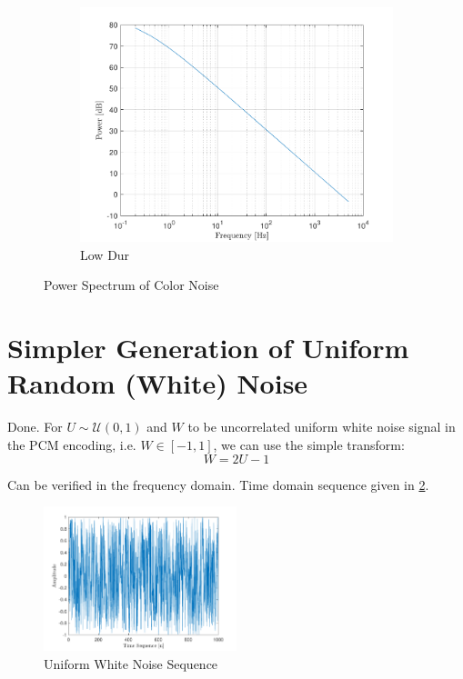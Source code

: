 \documentclass[10pt]{article}
\begin{document}
\begin{figure}[ht]
\begin{subfigure}[b]{0.31\textwidth}
        \includegraphics[width=\textwidth]{problem11_brown_noise_power_spectrum_db.pdf}
        \caption{Low Dur}
    \end{subfigure}
    \caption{Power Spectrum of Color Noise\vspace{-0.5cm}}
    \label{color_noise_freq_domain}
\end{figure}

\section{Simpler Generation of Uniform Random (White) Noise}
Done. For $U \sim \mathcal{U}(0,1)$ and $W$ to be uncorrelated uniform white noise signal in the PCM encoding, i.e. $W \in [-1,1]$, we can use the simple transform:
\[
    W = 2 U - 1
\]

Can be verified in the frequency domain. Time domain sequence given in \ref{uniform_white_noise}.

\begin{figure}[ht]
    \centering
    \includegraphics[width=0.5\textwidth]{problem12_uniform_white_noise_sequence.pdf}
    \caption{Uniform White Noise Sequence\vspace{-0.5cm}}
    \label{uniform_white_noise}
\end{figure}
\end{document}
